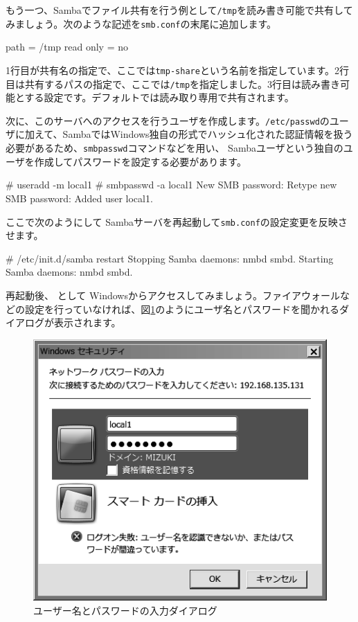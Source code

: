 \documentclass[mingoth,a4paper]{jsarticle}
\begin{document}
もう一つ、Sambaでファイル共有を行う例として{\tt{/tmp}}を読み書き可能で共有してみましょう。次のような記述を{\tt{smb.conf}}の末尾に追加します。

\begin{commandline}
  path = /tmp
  read only = no
\end{commandline}

1行目が共有名の指定で、ここでは{\tt{tmp-share}}という名前を指定しています。2行目は共有するパスの指定で、ここでは{\tt{/tmp}}を指定しました。3行目は読み書き可能とする設定です。デフォルトでは読み取り専用で共有されます。

次に、このサーバへのアクセスを行うユーザを作成します。{\tt{/etc/passwd}}のユーザに加えて、SambaではWindows独自の形式でハッシュ化された認証情報を扱う必要があるため、{\tt{smbpasswd}}コマンドなどを用い、 Sambaユーザという独自のユーザを作成してパスワードを設定する必要があります。

\begin{commandline}
# useradd -m local1
# smbpasswd -a local1
New SMB password:
Retype new SMB password:
Added user local1.
\end{commandline}

ここで次のようにして Sambaサーバを再起動して{\tt{smb.conf}}の設定変更を反映させます。

\begin{commandline}
# /etc/init.d/samba restart
Stopping Samba daemons: nmbd smbd.
Starting Samba daemons: nmbd smbd.
\end{commandline}

再起動後、{\yen}{\yen}{}{}{}{} として Windowsからアクセスしてみましょう。ファイアウォールなどの設定を行っていなければ、図\ref{fig:monyo-samba03.png}のようにユーザ名とパスワードを聞かれるダイアログが表示されます。

\begin{figure}[h]
\begin{center}
 \includegraphics[width=.5\hsize]{image201304/samba/monyo-samba03_mono.png}
 \caption{ユーザー名とパスワードの入力ダイアログ}
 \label{fig:monyo-samba03.png}
\end{center}
\end{figure}
\end{document}
